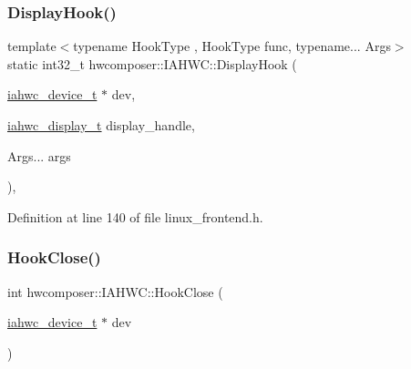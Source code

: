 \subsubsection{\texorpdfstring{Display\+Hook()}{DisplayHook()}}
{\footnotesize\ttfamily template$<$typename Hook\+Type , Hook\+Type func, typename... Args$>$ \\
static int32\+\_\+t hwcomposer\+::\+I\+A\+H\+W\+C\+::\+Display\+Hook (\begin{DoxyParamCaption}\item[{\mbox{\hyperlink{iahwc_8h_aa44e63a48d7c328d160f28888a6b3edd}{iahwc\+\_\+device\+\_\+t}} $\ast$}]{dev,  }\item[{\mbox{\hyperlink{iahwc_8h_a026bdbdf86a828fa3a4d800226e8f8c0}{iahwc\+\_\+display\+\_\+t}}}]{display\+\_\+handle,  }\item[{Args...}]{args }\end{DoxyParamCaption})\hspace{0.3cm}{\ttfamily [inline]}, {\ttfamily [static]}}



Definition at line 140 of file linux\+\_\+frontend.\+h.


\begin{DoxyCode}{0}
\end{DoxyCode}
\mbox{\label{classhwcomposer_1_1IAHWC_a215e268fcbbc3e7f8b025d2835f9cf35}} 
\subsubsection{\texorpdfstring{Hook\+Close()}{HookClose()}}
{\footnotesize\ttfamily int hwcomposer\+::\+I\+A\+H\+W\+C\+::\+Hook\+Close (\begin{DoxyParamCaption}\item[{\mbox{\hyperlink{iahwc_8h_aa44e63a48d7c328d160f28888a6b3edd}{iahwc\+\_\+device\+\_\+t}} $\ast$}]{dev }\end{DoxyParamCaption})\hspace{0.3cm}{\ttfamily [static]}}



